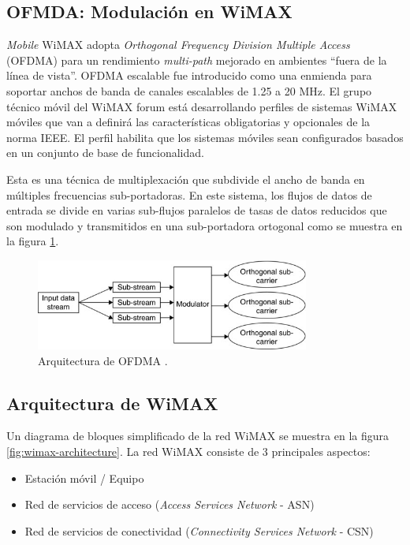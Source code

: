 \documentclass[10pt,journal,compsoc]{IEEEtran}
\begin{document}
\subsection{OFMDA: Modulación en WiMAX}
\emph{Mobile} WiMAX adopta \emph{Orthogonal Frequency Division Multiple Access} (OFDMA) para un rendimiento \emph{multi-path} mejorado en ambientes ``fuera de la línea de vista''. OFDMA escalable fue introducido como una enmienda para soportar anchos de banda de canales escalables de 1.25 a 20 MHz. El grupo técnico móvil del WiMAX forum está desarrollando perfiles de sistemas WiMAX móviles que van a definirá las características obligatorias y opcionales de la norma IEEE. El perfil habilita que los sistemas móviles sean configurados basados en un conjunto de base de funcionalidad. 

Esta es una técnica de multiplexación que subdivide el ancho de banda en múltiples frecuencias sub-portadoras. En este sistema, los flujos de datos de entrada se divide en varias sub-flujos paralelos de tasas de datos reducidos que son modulado y transmitidos en una sub-portadora ortogonal como se muestra en la figura \ref{fig:ofdma}.

\begin{figure}[h]
    \centering
    \includegraphics[width=9cm]{ofdma}
    \caption{Arquitectura de OFDMA \cite{mishra}.}
    \label{fig:ofdma}
\end{figure}

\subsection{Arquitectura de WiMAX}
Un diagrama de bloques simplificado de la red WiMAX se muestra en la figura \ref{fig:wimax-architecture}. La red WiMAX consiste de 3 principales aspectos:
\begin{itemize}
    \item Estación móvil / Equipo
    \item Red de servicios de acceso (\emph{Access Services Network} - ASN)
    \item Red de servicios de conectividad (\emph{Connectivity Services Network} - CSN)
\end{itemize}
\end{document}
